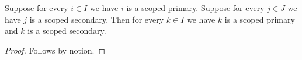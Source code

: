 

\begin{proposition}\label{horn_scoped_missing}
    Suppose for every $i\in I$ we have $i$ is a scoped primary.
    Suppose for every $j\in J$ we have $j$ is a scoped secondary.
    Then for every $k\in I$ we have $k$ is a scoped primary and $k$ is a scoped secondary.
\end{proposition}
\begin{proof}
    Follows by notion.
\end{proof}
